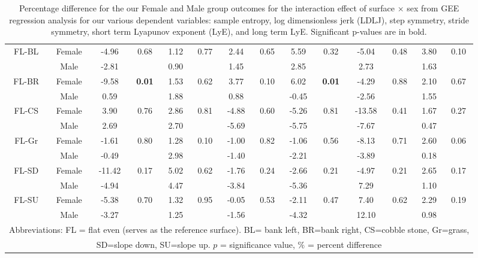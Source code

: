 \documentclass[authoryear,preprint,review,12pt]{elsarticle}
\begin{document}
{\begin{landscape}
\begin{table}[]
\begin{tabular}{cccc|cc|cc|cc|cc|cc}
\multirow{2}{*}{FL-BL} &
Female & 	-4.96&	\multirow{2}{*}{0.68}&	1.12&	\multirow{2}{*}{0.77}&	2.44&	\multirow{2}{*}{0.65}&	5.59&	\multirow{2}{*}{0.32}&	-5.04&	\multirow{2}{*}{0.48}&	3.80&	\multirow{2}{*}{0.10}\\
&Male& 	-2.81&	&	0.90&		&1.45&		&2.85&		&2.73&		&1.63	\\
\multirow{2}{*}{FL-BR} &										
Female&	-9.58&	\multirow{2}{*}{\textbf{0.01}}&	1.53&	\multirow{2}{*}{0.62}&	3.77&	\multirow{2}{*}{0.10}&	6.02&	\multirow{2}{*}{\textbf{0.01}}&	-4.29&	\multirow{2}{*}{0.88}&	2.10&	\multirow{2}{*}{0.67}\\
&Male& 	0.59&		&1.88&		&0.88&		&-0.45	&	&-2.56&		&1.55	         \\
\multirow{2}{*}{FL-CS}&										
Female &	3.90&	\multirow{2}{*}{0.76}&	2.86&	\multirow{2}{*}{0.81}&	-4.88&	\multirow{2}{*}{0.60}&	-5.26&	\multirow{2}{*}{0.81}&	-13.58&	\multirow{2}{*}{0.41}&	1.67&	\multirow{2}{*}{0.27}\\
&Male &	2.69&		&2.70	&	&-5.69&		&-5.75&		&-7.67&		&0.47	\\
\multirow{2}{*}{FL-Gr}	&	
Female& 	-1.61&	\multirow{2}{*}{0.80}&	1.28&	\multirow{2}{*}{0.10}&	-1.00&	\multirow{2}{*}{0.82}&	-1.06&	\multirow{2}{*}{0.56}&	-8.13&	\multirow{2}{*}{0.71}&	2.60&	\multirow{2}{*}{0.06}\\
& Male&	-0.49&		&2.98&		&-1.40&		&-2.21&		&-3.89&		&0.18	\\
\multirow{2}{*}{FL-SD} &	
Female& 	-11.42&	\multirow{2}{*}{0.17}&	5.02&	\multirow{2}{*}{0.62}&	-1.76&	\multirow{2}{*}{0.24}&	-2.66&	\multirow{2}{*}{0.21}&	-4.97&	\multirow{2}{*}{0.21}&	2.65&	\multirow{2}{*}{0.17}\\
&Male &	-4.94&		&4.47&		&-3.84&		&-5.36	&	&7.29&		&1.10	\\
\multirow{2}{*}{FL-SU}&
Female &	-5.38&	\multirow{2}{*}{0.70}	&1.32&	\multirow{2}{*}{0.95}&	-0.05&	\multirow{2}{*}{0.53}&	-2.11&	\multirow{2}{*}{0.47}&	7.40&	\multirow{2}{*}{0.62}&	2.29&	\multirow{2}{*}{0.19}\\
&Male& 	-3.27&		&1.25&		&-1.56&		&-4.32	&	&12.10&		&0.98	\\ \hline
\multicolumn{14}{c}{\scriptsize Abbreviations: FL = flat even (serves as the reference surface). BL= bank left, BR=bank right, CS=cobble stone, Gr=grass, } \\
         \multicolumn{14}{c}{\scriptsize SD=slope down, SU=slope up. $p$ = significance value, $\%$ = percent difference}
         
    \end{tabular}
    \caption{Percentage difference for the our Female and Male group outcomes for the interaction effect of surface $\times$ sex from GEE regression analysis for our various dependent variables: sample entropy, log dimensionless jerk (LDLJ), step symmetry, stride symmetry, short term Lyapunov exponent (LyE), and long term LyE. Significant p-values are in bold.}
    \label{tab:interaction-gee}
\end{table}



\end{landscape}}
\end{document}
